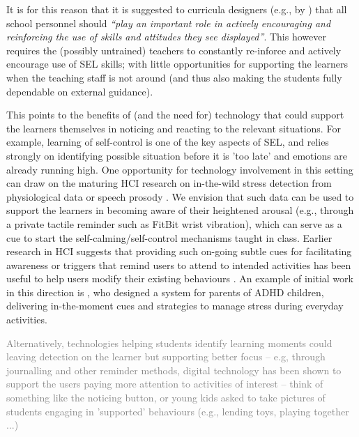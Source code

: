 \documentclass[prodmode,acmtochi]{acmsmall}
\newcommand{\rephrase}[1]{\textrm{\textrm{\textcolor{gray}{#1}}}}
\newcommand{\inqq}[1]{\textrm{\textit{``#1''}}}
\begin{document}
It is for this reason that it is suggested to curricula designers (e.g., by \cite[p. 56]{Elias}) that all school personnel should \inqq{play an important role in actively encouraging and reinforcing the use of skills and attitudes they see displayed}. This however requires the (possibly untrained) teachers to constantly re-inforce and actively encourage use of SEL skills; with little opportunities for supporting the learners when the teaching staff is not around (and thus also making the students fully dependable on external guidance). 

This points to the benefits of (and the need for) technology that could support the learners themselves in noticing and reacting to the relevant situations. For example, learning of self-control is one of the key aspects of SEL, and relies strongly on identifying possible situation before it is 'too late' and emotions are already running high. One opportunity for technology involvement in this setting can draw on the maturing HCI research on in-the-wild stress detection from physiological data or speech prosody \cite{Picard,Poh,Ertin2011,MSR Redmond,SSP-audio-review}. We envision that such data can be used to support the learners in becoming aware of their heightened arousal (e.g., through a private tactile reminder such as FitBit wrist vibration), which can serve as a cue to start the self-calming/self-control mechanisms taught in class. Earlier research in HCI suggests that providing such on-going subtle cues for facilitating awareness or triggers that remind users to attend to intended activities has been useful to help users modify their existing behaviours \cite{Consolvo2009,Obermair2008}. An example of initial work in this direction is , who designed a system for parents of ADHD children, delivering in-the-moment cues and strategies to manage stress during everyday activities.    %

\rephrase{Alternatively, technologies helping students identify learning moments could leaving detection on the learner but supporting better focus -- e.g,  through journalling and other reminder methods, digital technology has been shown to support the users paying more attention to activities of interest -- think of something like the noticing button, or young kids asked to take pictures of students engaging in 'supported' behaviours (e.g., lending toys, playing together ...)}
\end{document}
